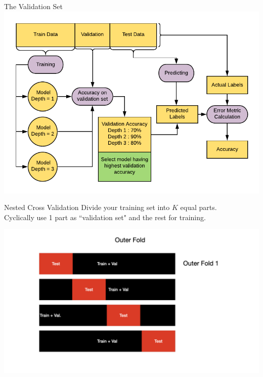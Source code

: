 \documentclass[usenames,dvipsnames]{beamer}
\begin{document}
\begin{frame}{The Validation Set}
\includegraphics[width = \textwidth]{../assets/bias-variance/diagrams/validation-workflow}
\end{frame}

\begin{frame}{Nested Cross Validation}
Divide your training set into $K$ equal 	parts.\\
Cyclically use 1 part as ``validation set" and the rest for training.\\
\begin{center}
\includegraphics[scale=0.18]{../assets/bias-variance/cross-validation.001.jpeg}
\end{center}
\end{frame}
\end{document}
